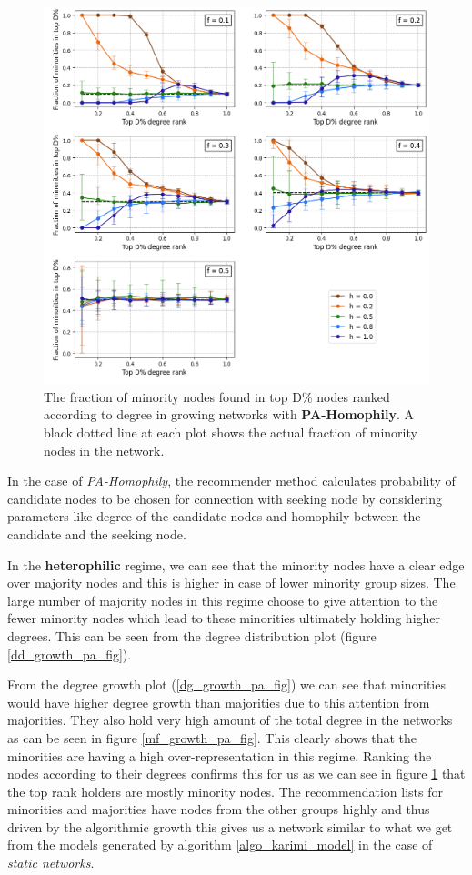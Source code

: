 \begin{figure}[h!]
	\centering
	\includegraphics[trim=0 10 0 5, clip, width=1.0\textwidth]{images/top_growth_pa.png}
	\caption{The fraction of minority nodes found in top D\% nodes ranked according to degree in growing networks with \textbf{PA-Homophily}. A black dotted line at each plot shows the actual fraction of minority nodes in the network.}
	\label{top_growth_pa_fig}
\end{figure}

In the case of \textit{PA-Homophily}, the recommender method calculates probability of candidate nodes to be chosen for connection with seeking node by considering parameters like degree of the candidate nodes and homophily between the candidate and the seeking node.

In the \textbf{heterophilic} regime, we can see that the minority nodes have a clear edge over majority nodes and this is higher in case of lower minority group sizes. The large number of majority nodes in this regime choose to give attention to the fewer minority nodes which lead to these minorities ultimately holding higher degrees. This can be seen from the degree distribution plot (figure \ref{dd_growth_pa_fig}).

From the degree growth plot (\ref{dg_growth_pa_fig}) we can see that minorities would have higher degree growth than majorities due to this attention from majorities. They also hold very high amount of the total degree in the networks as can be seen in figure \ref{mf_growth_pa_fig}. This clearly shows that the minorities are having a high over-representation in this regime. Ranking the nodes according to their degrees confirms this for us as we can see in figure \ref{top_growth_pa_fig} that the top rank holders are mostly minority nodes. The recommendation lists for minorities and majorities have nodes from the other groups highly and thus driven by the algorithmic growth this gives us a network similar to what we get from the models generated by algorithm \ref{algo_karimi_model} in the case of \textit{static networks}.

